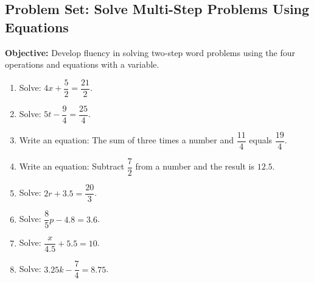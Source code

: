 \documentclass[12pt]{article}
\title{}
\date{}
\begin{document}
\subsection*{Problem Set: Solve Multi-Step Problems Using Equations}
\onehalfspacing

\begin{tcolorbox}[colframe=black!40, colback=gray!5, 
coltitle=black, colbacktitle=black!20, fonttitle=\bfseries\Large, 
title=Learning Objective, halign title=center, left=5pt, right=5pt, top=5pt, bottom=15pt]
\textbf{Objective:} Develop fluency in solving two-step word problems using the four operations and equations with a variable.
\end{tcolorbox}

\begin{tcolorbox}[colframe=black!60, colback=white, 
coltitle=black, colbacktitle=black!15, fonttitle=\bfseries\Large, 
title=Exercises, halign title=center, left=10pt, right=10pt, top=10pt, bottom=60pt]
\begin{enumerate}[itemsep=3em]
    \item Solve: \( 4x + \dfrac{5}{2} = \dfrac{21}{2} \).
    \item Solve: \( 5t - \dfrac{9}{4} = \dfrac{25}{4} \).
    \item Write an equation: The sum of three times a number and \( \dfrac{11}{4} \) equals \( \dfrac{19}{4} \).
    \item Write an equation: Subtract \( \dfrac{7}{2} \) from a number and the result is \( 12.5 \).
    \item Solve: \( 2r + 3.5 = \dfrac{20}{3} \).
    \item Solve: \( \dfrac{8}{5}p - 4.8 = 3.6 \).
    \item Solve: \( \dfrac{x}{4.5} + 5.5 = 10 \).
    \item Solve: \( 3.25k - \dfrac{7}{4} = 8.75 \).
\end{enumerate}
\end{tcolorbox}

\vspace{1em}
\end{document}

